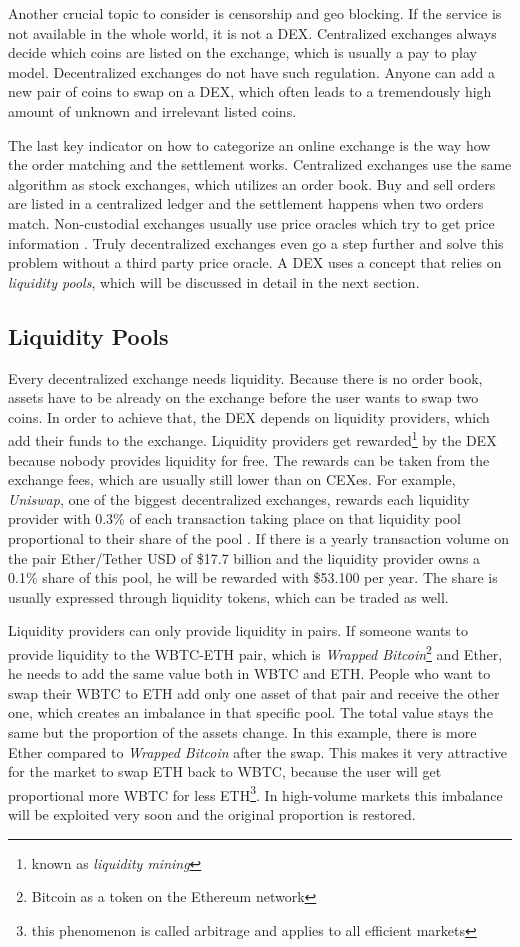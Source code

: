 Another crucial topic to consider is censorship and geo blocking. If the service is not available in the whole world, it is not a DEX. Centralized exchanges always decide which coins are listed on the exchange, which is usually a pay to play model. Decentralized exchanges do not have such regulation. Anyone can add a new pair of coins to swap on a DEX, which often leads to a tremendously high amount of unknown and irrelevant listed coins.

The last key indicator on how to categorize an online exchange is the way how the order matching and the settlement works. Centralized exchanges use the same algorithm as stock exchanges, which utilizes an order book. Buy and sell orders are listed in a centralized ledger and the settlement happens when two orders match. Non-custodial exchanges usually use price oracles which try to get price information \cite[p.\ 47]{WuSun2018}. Truly decentralized exchanges even go a step further and solve this problem without a third party price oracle. A DEX uses a concept that relies on \textit{liquidity pools}, which will be discussed in detail in the next section.

\subsection{Liquidity Pools}
\label{subsec:liquiditypools}
Every decentralized exchange needs liquidity. Because there is no order book, assets have to be already on the exchange before the user wants to swap two coins. In order to achieve that, the DEX depends on liquidity providers, which add their funds to the exchange. Liquidity providers get rewarded\footnote{known as \textit{liquidity mining}} by the DEX because nobody provides liquidity for free. The rewards can be taken from the exchange fees, which are usually still lower than on CEXes. For example, \textit{Uniswap}, one of the biggest decentralized exchanges, rewards each liquidity provider with 0.3\% of each transaction taking place on that liquidity pool proportional to their share of the pool \cite{Uniswap2020}. If there is a yearly transaction volume on the pair Ether/Tether USD of \$17.7 billion and the liquidity provider owns a 0.1\% share of this pool, he will be rewarded with \$53.100 per year. The share is usually expressed through liquidity tokens, which can be traded as well.

Liquidity providers can only provide liquidity in pairs. If someone wants to provide liquidity to the WBTC-ETH pair, which is \textit{Wrapped Bitcoin}\footnote{Bitcoin as a token on the Ethereum network} and Ether, he needs to add the same value both in WBTC and ETH. People who want to swap their WBTC to ETH add only one asset of that pair and receive the other one, which creates an imbalance in that specific pool. The total value stays the same but the proportion of the assets change. In this example, there is more Ether compared to \textit{Wrapped Bitcoin} after the swap. This makes it very attractive for the market to swap ETH back to WBTC, because the user will get proportional more WBTC for less ETH\footnote{this phenomenon is called arbitrage and applies to all efficient markets}. In high-volume markets this imbalance will be exploited very soon and the original proportion is restored.

